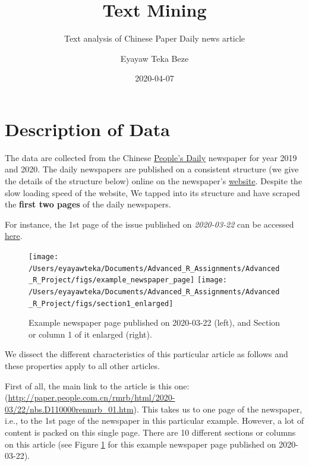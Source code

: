 \documentclass[
  12pt,
]{article}
\title{Text Mining}
\subtitle{Text analysis of Chinese Paper Daily news article}
\author{Eyayaw Teka Beze}
\date{2020-04-07}
\begin{document}
\maketitle

{
\hypersetup{linkcolor=}
\setcounter{tocdepth}{2}
\tableofcontents
}
\hypertarget{description-of-data}{%
\section{Description of Data}\label{description-of-data}}

The data are collected from the Chinese \href{https://en.wikipedia.org/wiki/People\%27s_Daily}{People's Daily} newspaper for year 2019 and 2020. The daily newspapers are published on a consistent structure (we give the details of the structure below) online on the newspaper's \href{paper.people.com.cn}{website}. Despite the slow loading speed of the website, We tapped into its structure and have scraped the \textbf{first two pages} of the daily newspapers.

For instance, the 1st page of the issue published on \emph{2020-03-22} can be accessed \href{http://paper.people.com.cn/rmrb/html/2020-03/22/nbs.D110000renmrb_01.htm}{here}.

\begin{figure}

{\centering \texttt{[image: /Users/eyayawteka/Documents/Advanced\_R\_Assignments/Advanced\_R\_Project/figs/example\_newspaper\_page]} \texttt{[image: /Users/eyayawteka/Documents/Advanced\_R\_Assignments/Advanced\_R\_Project/figs/section1\_enlarged]} 

}

\caption{Example newspaper page published on 2020-03-22 (left), and Section or column 1 of it enlarged (right).}\label{fig:example-newspaper}
\end{figure}

We dissect the different characteristics of this particular article as follows and these properties apply to all other articles.

First of all, the main link to the article is this one: (\url{http://paper.people.com.cn/rmrb/html/2020-03/22/nbs.D110000renmrb_01.htm}). This takes us to one page of the newspaper, i.e., to the 1st page of the newspaper in this particular example. However, a lot of content is packed on this single page. There are 10 different sections or columns on this article (see Figure \ref{fig:example-newspaper} for this example newspaper page published on 2020-03-22).
\end{document}
